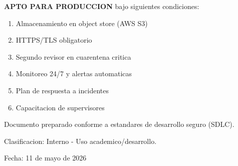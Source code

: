 \documentclass[12pt,a4paper]{article}
\begin{document}
\textbf{APTO PARA PRODUCCION} bajo siguientes condiciones:

\begin{enumerate}
    \item Almacenamiento en object store (AWS S3)
    \item HTTPS/TLS obligatorio
    \item Segundo revisor en cuarentena critica
    \item Monitoreo 24/7 y alertas automaticas
    \item Plan de respuesta a incidentes
    \item Capacitacion de supervisores
\end{enumerate}

\vspace{2cm}

\noindent Documento preparado conforme a estandares de desarrollo seguro (SDLC).

Clasificacion: Interno - Uso academico/desarrollo.

Fecha: 11 de mayo de 2026
\end{document}
